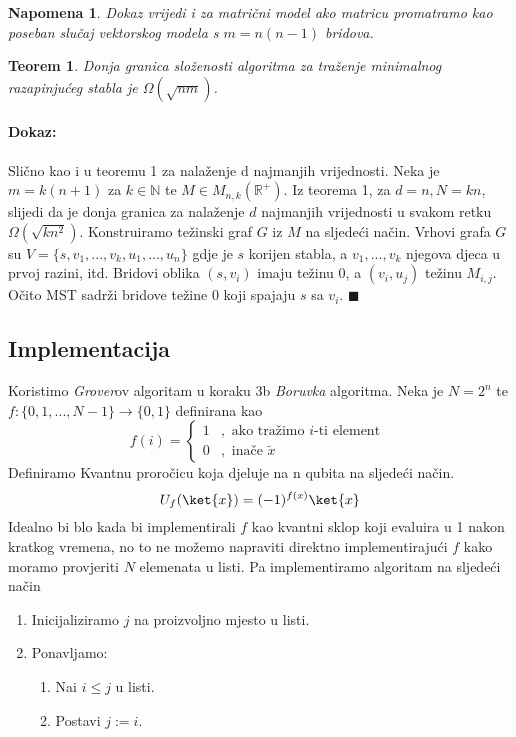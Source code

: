 \documentclass[a4paper,12pt]{article}
\newtheorem{nap}{Napomena}
\newtheorem{tm}{Teorem}
\begin{document}
\begin{nap}
Dokaz vrijedi i za matri\v{c}ni model ako matricu promatramo kao poseban slu\v{c}aj vektorskog modela s $m=n(n-1)$ bridova.
\end{nap}


\begin{tm}
Donja granica slo\v{z}enosti algoritma za tra\v{z}enje minimalnog razapinju\'ceg stabla je $\Omega (\sqrt{nm} )$.
\end{tm} 
\paragraph{Dokaz:\\}
Sli\v{c}no kao i u teoremu 1 za nala\v{z}enje d najmanjih vrijednosti. Neka je $m=k(n+1)$ za $k \in \mathbb{N} $ te $M \in M_{n,k}(\mathbb{R}^+)$. Iz teorema 1, za $ d=n, N=kn$, slijedi da je donja granica za nala\v{z}enje $d$ najmanjih vrijednosti u svakom retku $\Omega(\sqrt{kn^2})$. Konstruiramo te\v{z}inski graf $G$ iz $M$ na sljede\'ci na\v{c}in. Vrhovi grafa $G$ su $V= \{ s, v_1, ..., v_k, u_1, ..., u_n \}$ gdje je $s$ korijen stabla, a $v_1, ..., v_k$ njegova djeca u prvoj razini, itd. Bridovi oblika $(s,v_i)$ imaju te\v{z}inu $0$, a $(v_i, u_j)$ te\v{z}inu $M_{i,j}$. O\v{c}ito MST sadr\v{z}i bridove te\v{z}ine $0$ koji spajaju $s$ sa $v_i$. 
$\blacksquare$

\subsection{Implementacija}
Koristimo \emph{Grover}ov algoritam u koraku 3b \emph{Boruvka} algoritma. Neka je $N= 2^n$ te $f:\{0, 1, ..., N-1\} \rightarrow \{0,1\}$ definirana kao 
\begin{equation*}
f(i) = \begin{cases}
1              &, \text{  ako    tra\v{z}imo $i$-ti element }\\
0			  &, \text{  ina\v{c}e  } \tilde{x}
\end{cases}
\end{equation*}
Definiramo Kvantnu proro\v{c}icu koja djeluje na n qubita na sljede\'ci na\v{c}in.
\begin{equation}
	U_f(\ket{x})=(-1)^{f(x)}\ket{x}
\end{equation}
Idealno bi blo kada bi implementirali $f$ kao kvantni sklop koji evaluira u 1 nakon kratkog vremena, no to ne mo\v{z}emo napraviti direktno implementiraju\'ci $f$ kako moramo provjeriti $N$ elemenata u listi. Pa implementiramo algoritam na sljede\'ci na\v{c}in
\begin{enumerate}
	\item  Inicijaliziramo $j$ na proizvoljno mjesto u listi.
	\item  Ponavljamo:
	\begin{enumerate}
		\item  Na\dj{}i $i \leq j$ u listi.
		\item  Postavi $j:= i$.
	\end{enumerate}
\end{enumerate}
\end{document}
